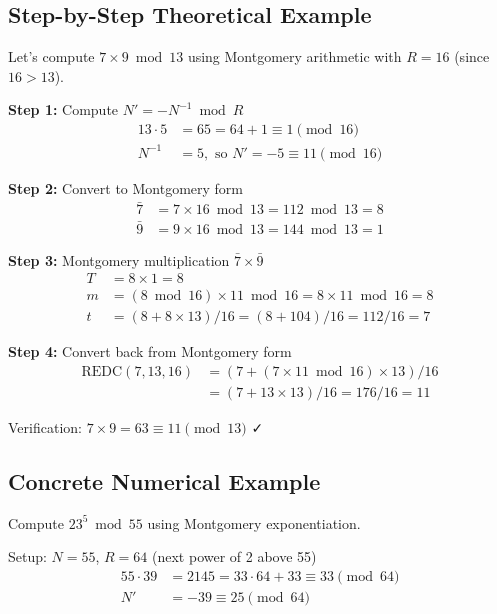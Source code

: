 \documentclass[12pt,a4paper]{article}
\theoremstyle{definition}
\begin{document}
\subsection{Step-by-Step Theoretical Example}

Let's compute $7 \times 9 \bmod 13$ using Montgomery arithmetic with $R = 16$ (since $16 > 13$).

\textbf{Step 1:} Compute $N' = -N^{-1} \bmod R$
\begin{align}
13 \cdot 5 &= 65 = 64 + 1 \equiv 1 \pmod{16}\\
N^{-1} &= 5, \text{ so } N' = -5 \equiv 11 \pmod{16}
\end{align}

\textbf{Step 2:} Convert to Montgomery form
\begin{align}
\bar{7} &= 7 \times 16 \bmod 13 = 112 \bmod 13 = 8\\
\bar{9} &= 9 \times 16 \bmod 13 = 144 \bmod 13 = 1
\end{align}

\textbf{Step 3:} Montgomery multiplication $\bar{7} \times \bar{9}$
\begin{align}
T &= 8 \times 1 = 8\\
m &= (8 \bmod 16) \times 11 \bmod 16 = 8 \times 11 \bmod 16 = 8\\
t &= (8 + 8 \times 13) / 16 = (8 + 104) / 16 = 112 / 16 = 7
\end{align}

\textbf{Step 4:} Convert back from Montgomery form
\begin{align}
\text{REDC}(7, 13, 16) &= (7 + (7 \times 11 \bmod 16) \times 13) / 16\\
&= (7 + 13 \times 13) / 16 = 176 / 16 = 11
\end{align}

Verification: $7 \times 9 = 63 \equiv 11 \pmod{13}$ ✓

\subsection{Concrete Numerical Example}

Compute $23^5 \bmod 55$ using Montgomery exponentiation.

Setup: $N = 55$, $R = 64$ (next power of 2 above 55)
\begin{align}
55 \cdot 39 &= 2145 = 33 \cdot 64 + 33 \equiv 33 \pmod{64}\\
N' &= -39 \equiv 25 \pmod{64}
\end{align}
\end{document}
